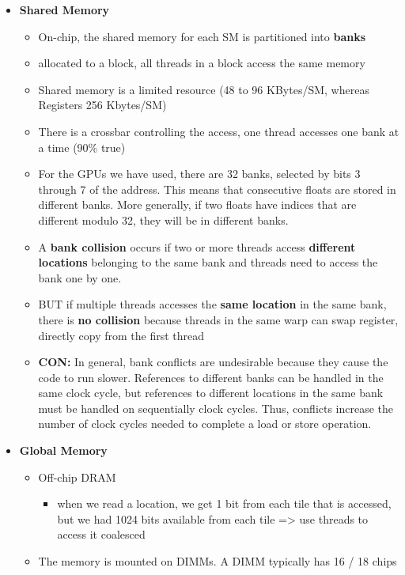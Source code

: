 \documentclass[../main.tex]{subfiles}
\begin{document}
\begin{itemize}
	\item \textbf{Shared Memory}
	      \begin{itemize}
		      \item On-chip, the shared memory for each SM is partitioned into \textbf{banks}
		      \item allocated to a block, all threads in a block access the same memory
		      \item Shared memory is a limited resource (48 to 96 KBytes/SM, whereas Registers 256 Kbytes/SM)
		      \item There is a crossbar controlling the access, one thread accesses one bank at a time (90\% true)
		      \item For the GPUs we have used, there are 32 banks, selected by bits 3 through 7 of the address. This means that consecutive floats are stored in different banks. More generally, if two floats have indices that are different modulo 32, they will be in different banks.
		      \item A \textbf{bank collision} occurs if two or more threads access \textbf{different locations} belonging to the same bank and threads need to access the bank one by one.
		      \item BUT if multiple threads accesses the \textbf{same location} in the same bank, there is \textbf{no collision} because threads in the same warp can swap register, directly copy from the first thread  %
		      \item \textbf{CON:} In general, bank conflicts are undesirable because they cause the code to run slower. References to different banks can be handled in the same clock cycle, but references to different locations in the same bank must be handled on sequentially clock cycles. Thus, conflicts increase the number of clock cycles needed to complete a load or store operation.
	      \end{itemize}
	\item \textbf{Global Memory}
	      \begin{itemize}
		      \item Off-chip DRAM
		            \begin{itemize}
			            \item when we read a location, we get 1 bit from each tile that is accessed, but we had 1024 bits available from each tile => use threads to access it coalesced %
		            \end{itemize}
		      \item The memory is mounted on DIMMs. A DIMM typically has 16 / 18 chips

\end{itemize}
\end{itemize}
\end{document}
